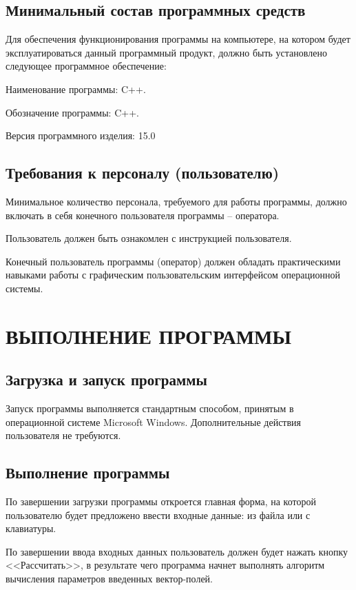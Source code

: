 \documentclass[14pt,a4paper,final]{extreport}
\begin{document}
\section{Минимальный состав программных средств}
Для обеспечения функционирования программы на компьютере, на котором будет эксплуатироваться данный программный продукт, должно быть установлено следующее программное обеспечение:

Наименование программы: C++.

Обозначение программы: C++.

Версия программного изделия: 15.0



\section{Требования к персоналу (пользователю)}

Минимальное количество персонала, требуемого для работы программы, должно включать в себя конечного пользователя программы -- оператора.

Пользователь должен быть ознакомлен с инструкцией пользователя.

Конечный пользователь программы (оператор) должен обладать практическими навыками работы с графическим пользовательским интерфейсом операционной системы.



\chapter{ ВЫПОЛНЕНИЕ ПРОГРАММЫ}
\section{ Загрузка и запуск программы}
Запуск программы выполняется стандартным способом, принятым в операционной системе Microsoft Windows. Дополнительные действия пользователя не требуются.

\section{ Выполнение программы}
По завершении загрузки программы откроется главная форма, на которой пользователю будет предложено ввести входные данные: из файла или с клавиатуры.

По завершении ввода входных данных пользователь должен будет нажать кнопку <<Рассчитать>>, в результате чего программа начнет выполнять алгоритм вычисления параметров введенных вектор-полей.
\end{document}
